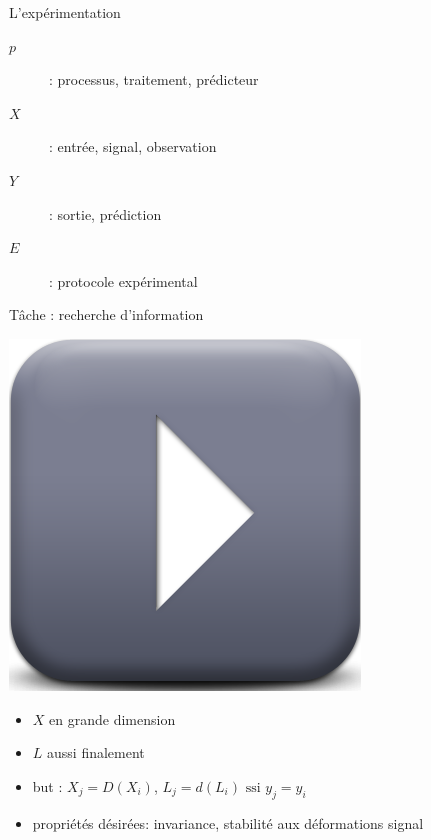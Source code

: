 \begin{frame}{L'expérimentation}
\begin{center}
\end{center}
\vspace{.8cm}
\begin{description}
\item[$p$]: processus, traitement, prédicteur
\item[$X$]: entrée, signal, observation
\item[$Y$]: sortie, prédiction
\item[$E$]: protocole expérimental
\end{description}
\end{frame}

\begin{frame}{\alert{Tâche} : recherche d'information}
\begin{center}
\includegraphics[width=.3\columnwidth]{figures/play}
\end{center}
\begin{itemize}
\item $X$ en grande dimension
\item $L$ aussi finalement
\item but : $X_j=D(X_i)$, $L_j=d(L_i) \text{ ssi } y_j=y_i$
\item propriétés désirées: invariance, stabilité aux déformations signal
\end{itemize}
\end{frame}

